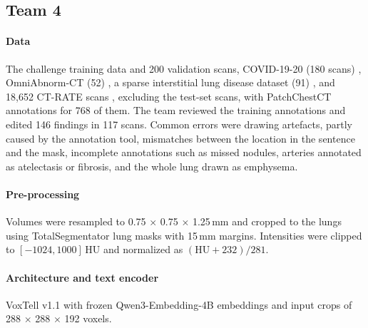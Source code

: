 \subsection{Team 4}
\label{app:team4}

\paragraph{Data} The challenge training data and 200 validation scans,
COVID-19-20 (180 scans) \citep{roth2022rapid},
OmniAbnorm-CT (52) \citep{zhao2026rethinking}, a sparse interstitial lung disease
dataset (91) \citep{depeursinge2012building}, and 18,652 CT-RATE
scans \citep{hamamci2026generalist}, excluding the test-set scans, with PatchChestCT
annotations \citep{li2026patchchestct} for 768 of them. The team reviewed
the training annotations and edited 146 findings in 117 scans. Common
errors were drawing artefacts, partly caused by the annotation tool, mismatches
between the location in the sentence and the mask, incomplete annotations such
as missed nodules, arteries annotated as atelectasis or fibrosis, and the whole
lung drawn as emphysema.

\paragraph{Pre-processing} Volumes were resampled to
0.75 $\times$ 0.75 $\times$ 1.25\,mm and cropped to the lungs using
TotalSegmentator lung masks \citep{wasserthal2023totalsegmentator} with 15\,mm
margins. Intensities were clipped to $[-1024, 1000]$\,HU and normalized as
$(\mathrm{HU} + 232)/281$.

\paragraph{Architecture and text encoder} VoxTell v1.1 \citep{rokuss2026voxtell}
with frozen Qwen3-Embedding-4B embeddings \citep{zhang2025qwen3} and input crops
of 288 $\times$ 288 $\times$ 192 voxels.

